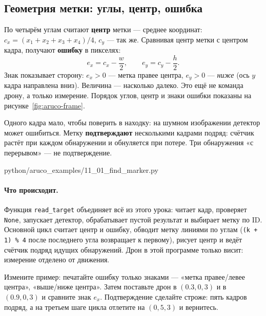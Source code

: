 \subsection{Геометрия метки: углы, центр, ошибка}
\label{sec:python-aruco-geometry}

По четырём углам считают \textbf{центр} метки --- среднее координат: $c_x = (x_1 + x_2 + x_3 + x_4) / 4$, $c_y$ --- так же. Сравнивая центр метки с центром кадра, получают \textbf{ошибку} в пикселях:
$$ e_x = c_x - \frac{w}{2}, \qquad e_y = c_y - \frac{h}{2}. $$
Знак показывает сторону: $e_x > 0$ --- метка правее центра, $e_y > 0$ --- \emph{ниже} (ось $y$ кадра направлена вниз). Величина --- насколько далеко. Это ещё не команда дрону, а только измерение. Порядок углов, центр и знаки ошибки показаны на рисунке~\ref{fig:aruco-frame}.



Одного кадра мало, чтобы поверить в находку: на шумном изображении детектор может ошибиться. Метку \textbf{подтверждают} несколькими кадрами подряд: счётчик растёт при каждом обнаружении и обнуляется при потере. Три обнаружения «с перерывом» --- не подтверждение.

\begin{codefile}[python]{python/aruco_examples/11_01_find_marker.py}
\end{codefile}

\paragraph{Что происходит.} Функция \verb|read_target| объединяет всё из этого урока: читает кадр, проверяет \verb|None|, запускает детектор, обрабатывает пустой результат и выбирает метку по ID. Основной цикл считает центр и ошибку, обводит метку линиями по углам (\verb|(k + 1) % 4| после последнего угла возвращает к первому), рисует центр и ведёт счётчик подряд идущих обнаружений. Дрон в этой программе только висит: измерение отделено от движения.

\begin{taskbox}
Измените пример: печатайте ошибку только знаками --- «метка правее/левее центра», «выше/ниже центра». Затем поставьте дрон в $(0.3, 0, 3)$ и в $(0.9, 0, 3)$ и сравните знак $e_x$. Подтверждение сделайте строже: пять кадров подряд, а на третьем шаге цикла отлетите на $(0, 5, 3)$ и вернитесь.
\end{taskbox}

